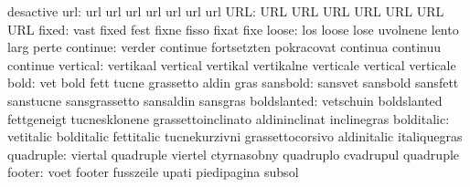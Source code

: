                            desactive
                      url: url                       url
                           url                       url
                           url                       url
                           url
                      URL: URL                       URL
                           URL                       URL
                           URL                       URL
                           URL
                    fixed: vast                      fixed
                           fest                      fixne
                           fisso                     fixat
                           fixe
                    loose: los                       loose
                           lose                      uvolnene
                           lento                     larg
                           perte
                 continue: verder                    continue
                           fortsetzten               pokracovat
                           continua                  continuu
                           continue
                 vertical: vertikaal                 vertical
                           vertikal                  vertikalne
                           verticale                 vertical
                           verticale
                     bold: vet                       bold
                           fett                      tucne
                           grassetto                 aldin
                           gras
                 sansbold: sansvet                   sansbold
                           sansfett                  sanstucne
                           sansgrassetto             sansaldin
                           sansgras
              boldslanted: vetschuin                 boldslanted
                           fettgeneigt               tucnesklonene
                           grassettoinclinato        aldininclinat
                           inclinegras
               bolditalic: vetitalic                 bolditalic
                           fettitalic                tucnekurzivni
                           grassettocorsivo          aldinitalic
                           italiquegras
                quadruple: viertal                   quadruple
                           viertel                   ctyrnasobny
                           quadruplo                 cvadrupul
                           quadruple
                   footer: voet                      footer
                           fusszeile                 upati
                           piedipagina               subsol
